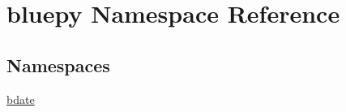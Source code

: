\hypertarget{namespacebluepy}{}\section{bluepy Namespace Reference}
\label{namespacebluepy}
\subsection*{Namespaces}
\begin{DoxyCompactItemize}
\item 
 \hyperlink{namespacebluepy_1_1bdate}{bdate}
\end{DoxyCompactItemize}
